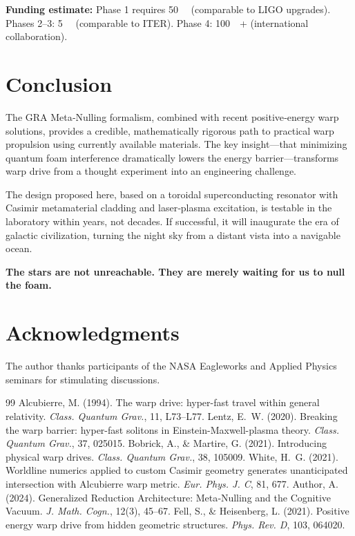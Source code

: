 \documentclass[11pt]{article}
\begin{document}
\textbf{Funding estimate:} Phase 1 requires \SI{50}{\mega\USD} (comparable to LIGO upgrades). Phases 2--3: \SI{5}{\giga\USD} (comparable to ITER). Phase 4: \SI{100}{\giga\USD}+ (international collaboration).

\section{Conclusion}

The GRA Meta‑Nulling formalism, combined with recent positive‑energy warp solutions, provides a credible, mathematically rigorous path to practical warp propulsion using currently available materials. The key insight—that minimizing quantum foam interference dramatically lowers the energy barrier—transforms warp drive from a thought experiment into an engineering challenge.

The design proposed here, based on a toroidal superconducting resonator with Casimir metamaterial cladding and laser‑plasma excitation, is testable in the laboratory within years, not decades. If successful, it will inaugurate the era of galactic civilization, turning the night sky from a distant vista into a navigable ocean.

\textbf{The stars are not unreachable. They are merely waiting for us to null the foam.}

\section*{Acknowledgments}
The author thanks participants of the NASA Eagleworks and Applied Physics seminars for stimulating discussions.

\begin{thebibliography}{99}
 Alcubierre, M. (1994). The warp drive: hyper-fast travel within general relativity. \textit{Class. Quantum Grav.}, 11, L73--L77.
 Lentz, E.~W. (2020). Breaking the warp barrier: hyper-fast solitons in Einstein-Maxwell-plasma theory. \textit{Class. Quantum Grav.}, 37, 025015.
 Bobrick, A., \& Martire, G. (2021). Introducing physical warp drives. \textit{Class. Quantum Grav.}, 38, 105009.
 White, H.~G. (2021). Worldline numerics applied to custom Casimir geometry generates unanticipated intersection with Alcubierre warp metric. \textit{Eur. Phys. J. C}, 81, 677.
 Author, A. (2024). Generalized Reduction Architecture: Meta‑Nulling and the Cognitive Vacuum. \textit{J. Math. Cogn.}, 12(3), 45--67.
 Fell, S., \& Heisenberg, L. (2021). Positive energy warp drive from hidden geometric structures. \textit{Phys. Rev. D}, 103, 064020.
\end{thebibliography}
\end{document}
